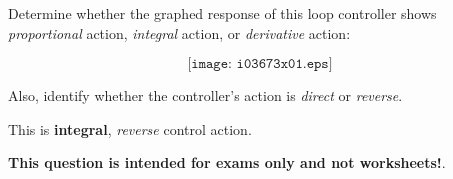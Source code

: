 

Determine whether the graphed response of this loop controller shows {\it proportional} action, {\it integral} action, or {\it derivative} action:

$$\texttt{[image: i03673x01.eps]}$$

Also, identify whether the controller's action is {\it direct} or {\it reverse}.







This is {\bf integral}, {\it reverse} control action.







{\bf This question is intended for exams only and not worksheets!}.


